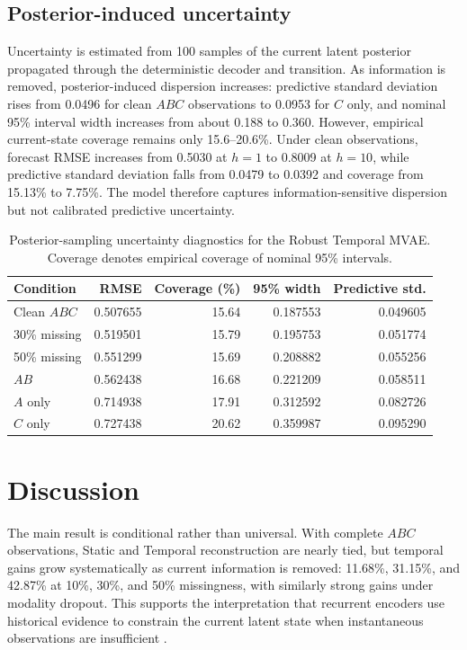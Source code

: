 \documentclass[10pt,twocolumn]{article}
\begin{document}
\subsection{Posterior-induced uncertainty}
Uncertainty is estimated from 100 samples of the current latent posterior propagated through the deterministic decoder and transition. As information is removed, posterior-induced dispersion increases: predictive standard deviation rises from 0.0496 for clean $ABC$ observations to 0.0953 for $C$ only, and nominal 95\% interval width increases from about 0.188 to 0.360. However, empirical current-state coverage remains only 15.6--20.6\%. Under clean observations, forecast RMSE increases from 0.5030 at $h=1$ to 0.8009 at $h=10$, while predictive standard deviation falls from 0.0479 to 0.0392 and coverage from 15.13\% to 7.75\%. The model therefore captures information-sensitive dispersion but not calibrated predictive uncertainty.

\begin{table}[t]
\centering
\caption{Posterior-sampling uncertainty diagnostics for the Robust Temporal MVAE. Coverage denotes empirical coverage of nominal 95\% intervals.}
\label{tab:uncertainty}
\begin{tabular}{lrrrr}
\toprule
Condition & RMSE & Coverage (\%) & 95\% width & Predictive std.\\
\midrule
Clean $ABC$ & 0.507655 & 15.64 & 0.187553 & 0.049605\\
30\% missing & 0.519501 & 15.79 & 0.195753 & 0.051774\\
50\% missing & 0.551299 & 15.69 & 0.208882 & 0.055256\\
$AB$ & 0.562438 & 16.68 & 0.221209 & 0.058511\\
$A$ only & 0.714938 & 17.91 & 0.312592 & 0.082726\\
$C$ only & 0.727438 & 20.62 & 0.359987 & 0.095290\\
\bottomrule
\end{tabular}
\end{table}

\section{Discussion}
The main result is conditional rather than universal. With complete $ABC$ observations, Static and Temporal reconstruction are nearly tied, but temporal gains grow systematically as current information is removed: 11.68\%, 31.15\%, and 42.87\% at 10\%, 30\%, and 50\% missingness, with similarly strong gains under modality dropout. This supports the interpretation that recurrent encoders use historical evidence to constrain the current latent state when instantaneous observations are insufficient \citep{tan2020factorized}.
\end{document}
